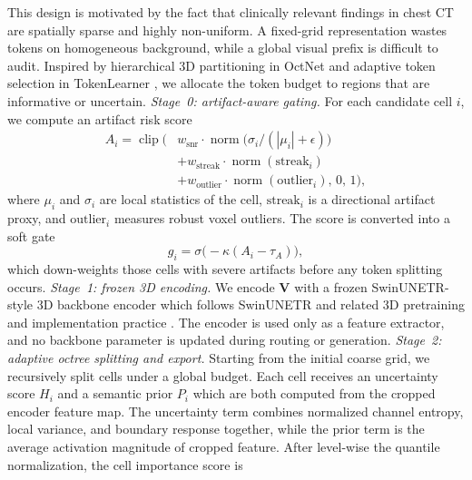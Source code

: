 This design is motivated by the fact that clinically relevant findings in chest CT are spatially sparse and highly non-uniform. A fixed-grid representation wastes tokens on homogeneous background, while a global visual prefix is difficult to audit. Inspired by hierarchical 3D partitioning in OctNet \cite{riegler2017octnet} and adaptive token selection in TokenLearner \cite{ryoo2021tokenlearner}, we allocate the token budget to regions that are informative or uncertain. \noindent\emph{Stage~0: artifact-aware gating.}
For each candidate cell $i$, we compute an artifact risk score
\begin{equation}
\begin{aligned}
A_i
= \operatorname{clip}\!\Big(
& w_{\mathrm{snr}}\cdot \operatorname{norm}\!\big(\sigma_i/(|\mu_i|+\epsilon)\big) \\
& + w_{\mathrm{streak}}\cdot \operatorname{norm}(\mathrm{streak}_i) \\
& + w_{\mathrm{outlier}}\cdot \operatorname{norm}(\mathrm{outlier}_i),
\,0,\,1
\Big),
\end{aligned}
\label{eq:artifact_new}
\end{equation}
where $\mu_i$ and $\sigma_i$ are local statistics of the cell, $\mathrm{streak}_i$ is a directional artifact proxy, and $\mathrm{outlier}_i$ measures robust voxel outliers. The score is converted into a soft gate
\begin{equation}
g_i=\sigma\!\big(-\kappa(A_i-\tau_A)\big),
\label{eq:gate_new}
\end{equation}
which down-weights those cells with severe artifacts before any token splitting occurs. \noindent\emph{Stage~1: frozen 3D encoding.}
We encode $\mathbf{V}$ with a frozen SwinUNETR-style 3D backbone encoder which follows SwinUNETR \cite{hatamizadeh2022swinunetr} and related 3D pretraining and implementation practice \cite{tang2022selfsupervised,cardoso2022monai}. The encoder is used only as a feature extractor, and no backbone parameter is updated during routing or generation. \noindent\emph{Stage~2: adaptive octree splitting and export.} Starting from the initial coarse grid, we recursively split cells under a global budget. Each cell receives an uncertainty score $H_i$ and a semantic prior $P_i$ which are both computed from the cropped encoder feature map. The uncertainty term combines normalized channel entropy, local variance, and boundary response together, while the prior term is the average activation magnitude of cropped feature. After level-wise the quantile normalization, the cell importance score is
